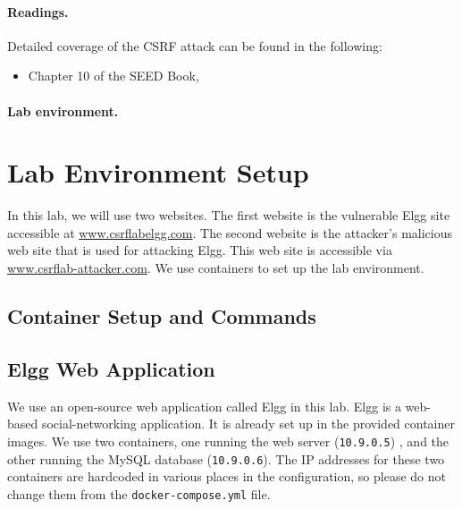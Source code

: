 \paragraph{Readings.}
Detailed coverage of the CSRF attack can be found in the following:

\begin{itemize}
\item Chapter 10 of the SEED Book, \seedbook
\end{itemize}


\paragraph{Lab environment.} \seedenvironmentB



\section{Lab Environment Setup}

In this lab, we will use two websites. 
The first website is the vulnerable Elgg
site accessible at \url{www.csrflabelgg.com}. The second
website is the attacker's malicious web site that is used for
attacking Elgg. This web site is accessible via
\url{www.csrflab-attacker.com}. We use containers to
set up the lab environment.


\subsection{Container Setup and Commands}




\subsection{Elgg Web Application}

We use an open-source web application called Elgg in this lab.
Elgg is a web-based social-networking application.
It is already set up in the provided container images.
We use two containers, one running the web server (\texttt{10.9.0.5}) ,
and the other running the MySQL database (\texttt{10.9.0.6}).
The IP addresses for these two containers are hardcoded in various
places in the configuration, so please do not change them from
the \texttt{docker-compose.yml} file.

